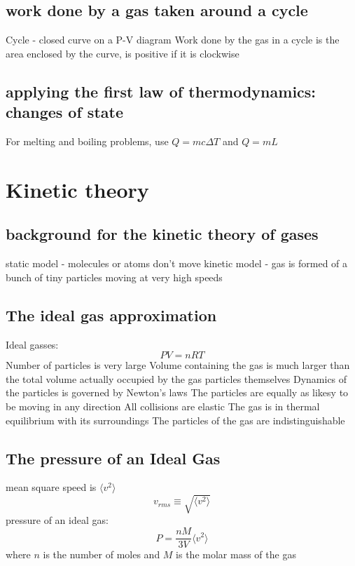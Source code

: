\documentclass{article}
\begin{document}
\subsection{work done by a gas taken around a cycle}
\begin{outline}
\1 Cycle - closed curve on a P-V diagram
\1 Work done by the gas in a cycle is the area enclosed by the curve, is positive if it is clockwise
\end{outline}
\subsection{applying the first law of thermodynamics: changes of state}
\begin{outline}
\1 For melting and boiling problems, use \(Q=mc\Delta T\) and \(Q=mL\)
\end{outline}
\section{Kinetic theory} 
\subsection{background for the kinetic theory of gases}
\begin{outline}
\1 static model - molecules or atoms don't move
\1 kinetic model - gas is formed of a bunch of tiny particles moving at very high speeds
\end{outline}
\subsection{The ideal gas approximation}
\begin{outline}
\1 Ideal gasses: \[PV=nRT\]
\2 Number of particles is very large
\2 Volume containing the gas is much larger than the total volume actually occupied by the gas particles themselves
\2 Dynamics of the particles is governed by Newton's laws
\2 The particles are equally as likesy to be moving in any direction
\2 All collisions are elastic
\2 The gas is in thermal equilibrium with its surroundings
\2 The particles of the gas are indistinguishable
\end{outline}
\subsection{The pressure of an Ideal Gas}
\begin{outline}
\1 mean square speed is $\langle v^2\rangle$
\0 \[v_{rms}\equiv\sqrt{\langle v^2\rangle}\]
\1 pressure of an ideal gas: \[P=\dfrac{nM}{3V}\langle v^2\rangle\] where $n$ is the number of moles and $M$ is the molar mass of the gas
\end{outline}
\end{document}
